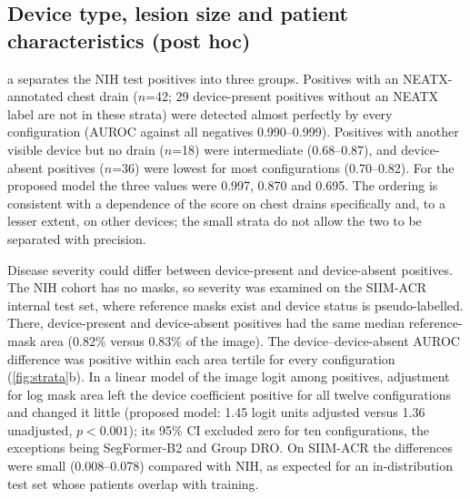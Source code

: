\documentclass{ieeeaccess}
\begin{document}
\subsection{Device type, lesion size and patient characteristics (post hoc)}
\label{sec:res-strata}
a separates the NIH test positives into three groups. Positives with an NEATX-annotated chest drain ($n$=42; 29 device-present positives without an NEATX label are not in these strata) were detected almost perfectly by every configuration (AUROC against all negatives 0.990--0.999). Positives with another visible device but no drain ($n$=18) were intermediate (0.68--0.87), and device-absent positives ($n$=36) were lowest for most configurations (0.70--0.82). For the proposed model the three values were 0.997, 0.870 and 0.695. The ordering is consistent with a dependence of the score on chest drains specifically and, to a lesser extent, on other devices; the small strata do not allow the two to be separated with precision.

Disease severity could differ between device-present and device-absent positives. The NIH cohort has no masks, so severity was examined on the SIIM-ACR internal test set, where reference masks exist and device status is pseudo-labelled. There, device-present and device-absent positives had the same median reference-mask area (0.82\% versus 0.83\% of the image). The device--device-absent AUROC difference was positive within each area tertile for every configuration (\cref{fig:strata}b). In a linear model of the image logit among positives, adjustment for log mask area left the device coefficient positive for all twelve configurations and changed it little (proposed model: 1.45 logit units adjusted versus 1.36 unadjusted, $p<0.001$); its 95\% CI excluded zero for ten configurations, the exceptions being SegFormer-B2 and Group DRO. On SIIM-ACR the differences were small (0.008--0.078) compared with NIH, as expected for an in-distribution test set whose patients overlap with training.
\end{document}
